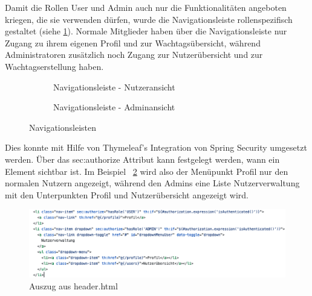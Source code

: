 \documentclass[fontsize=12pt,openright,oneside,paper=a4,BCOR=1cm]{scrbook}
\begin{document}
Damit die Rollen \glqq User\grqq{} und \glqq Admin\grqq{} auch nur die Funktionalit\"aten angeboten kriegen, die sie verwenden d\"urfen, wurde die Navigationsleiste rollenspezifisch gestaltet (siehe \ref{fig:anwendungNavbars}). Normale Mitglieder haben \"uber die Navigationsleiste nur Zugang zu ihrem eigenen Profil und zur Wachtags\"ubersicht, w\"ahrend Administratoren zus\"atzlich noch Zugang zur Nutzer\"ubersicht und zur Wachtagserstellung haben.

\begin{figure}[H]
  \centering
  \begin{subfigure}[b]{0.7\linewidth}
    \caption{Navigationsleiste - Nutzeransicht}
  \end{subfigure}
  \begin{subfigure}[b]{0.7\linewidth}
    \caption{Navigationsleiste - Adminansicht}
  \end{subfigure}
  \caption{Navigationsleisten}
  \label{fig:anwendungNavbars}
\end{figure}

Dies konnte mit Hilfe von Thymeleaf's Integration von Spring Security umgesetzt werden. \"Uber das \glqq sec:authorize\grqq{} Attribut kann festgelegt werden, wann ein Element sichtbar ist. Im Beispiel ~\ref{fig:code-navbar} wird also der Men\"upunkt \glqq Profil\grqq{} nur den normalen Nutzern angezeigt, w\"ahrend den Admins eine Liste \glqq Nutzerverwaltung\grqq{} mit den Unterpunkten \glqq Profil\grqq{} und \glqq Nutzer\"ubersicht\grqq{} angezeigt wird.

\begin{figure}[H]
  \centering
    \includegraphics[width=0.7\linewidth]{Anlagen/Code/navbar.png}
    \caption{Auszug aus header.html}
  \label{fig:code-navbar}
\end{figure}
\end{document}
